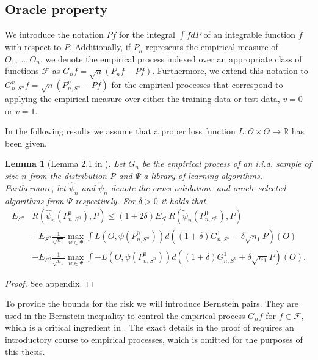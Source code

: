 \documentclass[11pt, a4paper]{article}
\newtheorem{lemma}[theorem]{Lemma}
\theoremstyle{definition}
\theoremstyle{remark}
\newcommand{\la}{\psi}
\newcommand{\Sn}{S^n}
\newcommand{\lib}{\Psi}
\begin{document}
\subsection{Oracle property}
We introduce the notation $Pf$ for the integral $\int f dP$ of an integrable function $f$ with respect to $P$. Additionally, if $P_n$ represents the empirical measure of $O_1, \dots, O_n$, we denote the empirical process indexed over an appropriate class of functions $\mathcal{F}$ as $G_n f = \sqrt{n}(P_n f - P f)$. Furthermore, we extend this notation to $G_{n, \Sn}^{v} f = \sqrt{n}(P_{n, \Sn}^{v} - Pf)$ for the empirical processes that correspond to applying the empirical measure over either the training data or test data, $ v = 0 $ or $ v = 1 $.

In the following results we assume that a proper loss function $ L: \mathcal{O} \times \Theta \to \mathbb{R} $ has been given.  
\begin{lemma}[Lemma 2.1 in \parencite{vaart06}] \label{finitesampledecomp}
    Let $ G_{n} $ be the empirical process of an i.i.d. sample of size $ n $ from the distribution P and $ \lib$ a library of learning algorithms. Furthermore, let $ \hat{\la}_n  $ and $ \tilde{\la}_n $ denote the cross-validation- and oracle selected algorithms from $ \lib $ respectively. For $ \delta > 0 $ it holds that
   \begin{align*}
       E_{\Sn} &R( \hat{\la}_n(P_{n, \Sn}^{0}), P) \leq (1 + 2 \delta) E_{\Sn} R( \tilde{\la}_n(P_{n, \Sn}^{0}) , P ) \\ 
                                                                &+E_{\Sn} \frac{1}{\sqrt{n_1} } \max_{\la \in \lib} \int L(O, \la(P_{n, \Sn}^{0})) d ((1 + \delta) G_{n,\Sn}^{1} - \delta \sqrt{n_1} P)(O)  \\
                                                                &+E_{\Sn} \frac{1}{\sqrt{n_1} } \max_{\la \in \lib} \int-L(O, \la(P_{n, \Sn}^{0})) d ((1 + \delta) G_{n,\Sn}^{1} + \delta \sqrt{n_1} P)(O).
   \end{align*}
\end{lemma}
\begin{proof}
    See appendix.
\end{proof}
\noindent To provide the bounds for the risk we will introduce Bernstein pairs. They are used in the Bernstein inequality to control the empirical process $ G_nf $ for $ f \in \mathcal{F} $, which is a critical ingredient in . The exact details in the proof of  requires an introductory course to empirical processes, which is omitted for the purposes of this thesis.  
\end{document}
